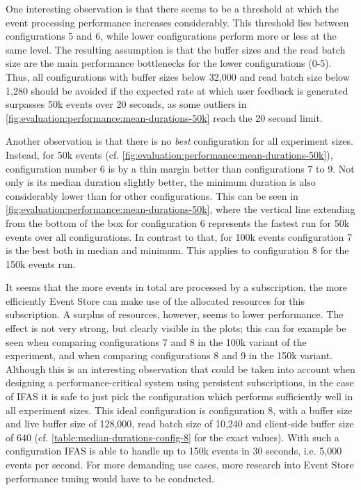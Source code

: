 One interesting observation is that there seems to be a threshold at which the event processing performance increases considerably.
This threshold lies between configurations 5 and 6, while lower configurations perform more or less at the same level.
The resulting assumption is that the buffer sizes and the read batch size are the main performance bottlenecks for the lower configurations (0-5).
Thus, all configurations with buffer sizes below 32,000 and read batch size below 1,280 should be avoided if the expected rate at which user feedback is generated surpasses 50k events over 20 seconds, as some outliers in \cref{fig:evaluation:performance:mean-durations-50k} reach the 20 second limit.

Another observation is that there is no \emph{best} configuration for all experiment sizes.
Instead, for 50k events (cf. \cref{fig:evaluation:performance:mean-durations-50k}), configuration number 6 is by a thin margin better than configurations 7 to 9.
Not only is its median duration slightly better, the minimum duration is also considerably lower than for other configurations.
This can be seen in \cref{fig:evaluation:performance:mean-durations-50k}, where the vertical line extending from the bottom of the box for configuration 6 represents the fastest run for 50k events over all configurations.
In contrast to that, for 100k events configuration 7 is the best both in median and minimum.
This applies to configuration 8 for the 150k events run.

It seems that the more events in total are processed by a subscription, the more efficiently Event Store can make use of the allocated resources for this subscription.
A surplus of resources, however, seems to lower performance.
The effect is not very strong, but clearly visible in the plots; this can for example be seen when comparing configurations 7 and 8 in the 100k variant of the experiment, and when comparing configurations 8 and 9 in the 150k variant.
Although this is an interesting observation that could be taken into account when designing a performance-critical system using persistent subscriptions, in the case of \ac{IFAS} it is safe to just pick the configuration which performs sufficiently well in all experiment sizes.
This ideal configuration is configuration 8, with a buffer size and live buffer size of 128,000, read batch size of 10,240 and client-side buffer size of 640 (cf. \cref{table:median-durations-config-8} for the exact values).
With such a configuration \ac{IFAS} is able to handle up to 150k events in 30 seconds, i.e. 5,000 events per second.
For more demanding use cases, more research into Event Store performance tuning would have to be conducted.


